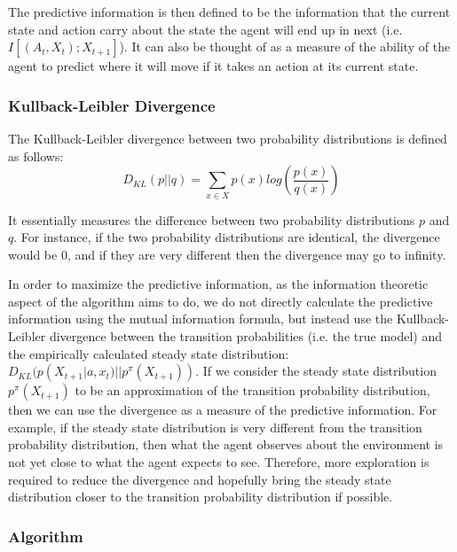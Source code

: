 \documentclass{acm_proc_article-sp}
\begin{document}
The predictive information is then defined to be the information that the current state and action carry about the state the agent will end up in next (i.e. $I[(A_t,X_t); X_{t+1}]$). It can also be thought of as a measure of the ability of the agent to predict where it will move if it takes an action at its current state. 

\subsubsection{Kullback-Leibler Divergence}


The Kullback-Leibler divergence between two probability distributions is defined as follows: 
\[D_{KL}(p || q) = \sum_{x \in X} p(x)log(\frac{p(x)}{q(x)})\]

It essentially measures the difference between two probability distributions $p$ and $q$. For instance, if the two probability distributions are identical, the divergence would be 0, and if they are very different then the divergence may go to infinity.

In order to maximize the predictive information, as the information theoretic aspect of the algorithm aims to do, we do not directly calculate the predictive information using the mutual information formula, but instead use the Kullback-Leibler divergence between the transition probabilities (i.e. the true model) and the empirically calculated steady state distribution: $D_{KL}(p(X_{t+1}|a, x_t) || p^\pi(X_{t+1}))$. If we consider the steady state distribution $p^\pi(X_{t+1})$ to be an approximation of the transition probability distribution, then we can use the divergence as a measure of the predictive information. For example, if the steady state distribution is very different from the transition probability distribution, then what the agent observes about the environment is not yet close to what the agent expects to see. Therefore, more exploration is required to reduce the divergence and hopefully bring the steady state distribution closer to the transition probability distribution if possible. 

\subsubsection{Algorithm} %
\end{document}
